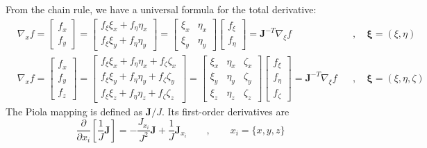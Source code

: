 \documentclass{article}
\newcommand{\bxi}{\boldsymbol{\xi}}
\begin{document}
From the chain rule, we have a universal formula for the total derivative:
\begin{subequations}\label{Mapped_Gradient}
\begin{align}
&\nabla_{x}f = \begin{bmatrix} f_x \\ f_y \end{bmatrix} = \begin{bmatrix} f_{\xi}\xi_x + f_{\eta}\eta_x \\ f_{\xi}\xi_y + f_{\eta}\eta_y \end{bmatrix} = \begin{bmatrix} \xi_x & \eta_x \\ \xi_y & \eta_y \end{bmatrix}\begin{bmatrix} f_{\xi} \\ f_{\eta} \end{bmatrix} = \mathbf{J}^{-T}\nabla_{\xi}f		&&,\quad\bxi = (\xi,\eta) \\
&\nabla_{x}f = \begin{bmatrix} f_x \\ f_y \\ f_z \end{bmatrix} = \begin{bmatrix} f_{\xi}\xi_x + f_{\eta}\eta_x + f_{\zeta}\zeta_x \\ f_{\xi}\xi_y + f_{\eta}\eta_y + f_{\zeta}\zeta_y \\ f_{\xi}\xi_z + f_{\eta}\eta_z + f_{\zeta}\zeta_z \end{bmatrix} = \begin{bmatrix} \xi_x & \eta_x & \zeta_x \\ \xi_y & \eta_y & \zeta_y \\ \xi_z & \eta_z & \zeta_z \end{bmatrix}\begin{bmatrix} f_{\xi} \\ f_{\eta} \\ f_{\zeta} \end{bmatrix} = \mathbf{J}^{-T}\nabla_{\xi}f	&&,\quad\bxi = (\xi,\eta,\zeta)
\end{align}
\end{subequations}
The Piola mapping is defined as $\mathbf{J}/J$. Its first-order derivatives are
\begin{equation}
\frac{\partial}{\partial x_i}\left[\frac{1}{J}\mathbf{J}\right] = -\frac{J_{x_i}}{J^2}\mathbf{J}+\frac{1}{J}\mathbf{J}_{x_i} \qquad,\qquad x_i = \{x,y,z\}
\end{equation}
\end{document}
